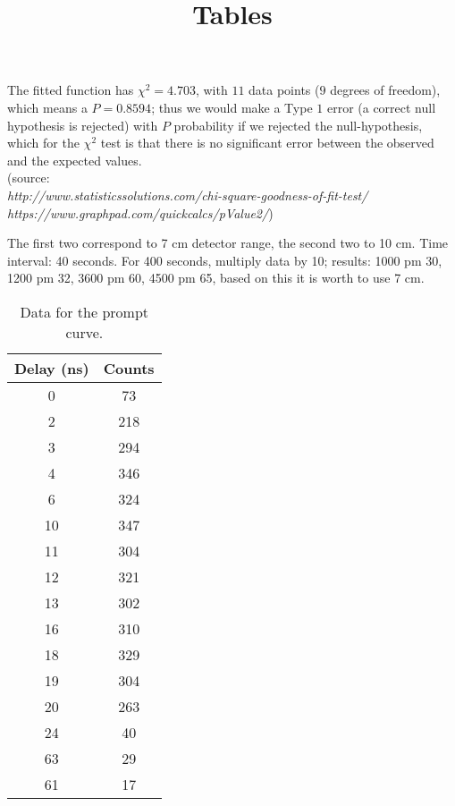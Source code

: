 \documentclass{article}
\title{Tables}
\begin{document}
\par The fitted function has $\chi^2 = 4.703$, with $11$ data points ($9$ degrees of freedom), which means a $P=0.8594$; thus we would make a Type $1$ error (a correct null hypothesis is rejected) with $P$ probability if we rejected the null-hypothesis, which for the $\chi^2$ test is that there is no significant error between the observed and the expected values. \\
(source: \\
\textit{http://www.statisticssolutions.com/chi-square-goodness-of-fit-test/ \\
https://www.graphpad.com/quickcalcs/pValue2/})
\par The first two correspond to 7 cm detector range, the second two to 10 cm. Time interval: 40 seconds. For 400 seconds, multiply data by 10; results: 1000 pm 30, 1200 pm 32, 3600 pm 60, 4500 pm 65, based on this it is worth to use 7 cm. 
\begin{table}
\centering
\begin{tabular}{| c | c |}
\hline
Delay (ns)	&	Counts\\[0.5ex] \hline\hline
0			& 	73\\ 	\hline
2			& 	218\\	\hline
3			& 	294\\	\hline
4			& 	346\\	\hline
6			& 	324\\	\hline
10			& 	347\\	\hline
11			& 	304\\ 	\hline
12			& 	321\\	\hline
13			& 	302\\	\hline
16			& 	310\\	\hline
18			& 	329\\	\hline
19			& 	304\\	\hline
20			& 	263\\	\hline
24			& 	40\\	\hline
63			& 	29\\	\hline
61			& 	17\\	\hline
\end{tabular}
\caption{Data for the prompt curve.}
\end{table}
\end{document}
